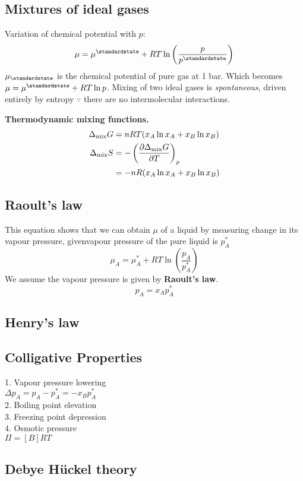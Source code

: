 \subsection*{Mixtures of ideal gases}
Variation of chemical potential with $p$:
\begin{equation*}
    \mu = \mu^\standardstate + RT \ln \left(\frac{p}{p^\standardstate}\right)
\end{equation*}
$\mu_\standardstate$ is the chemical potential of pure gas at 1 bar. Which becomes $ \mu = \mu^\standardstate + RT \ln p$. 
Mixing of two ideal gases is \textit{spontaneous}, driven entirely by entropy $\because$ there are no intermolecular interactions.
\vspace{\baselineskip}

\textbf{Thermodynamic mixing functions.}
\begin{equation*}
    \begin{aligned}
    \Delta_{\textrm{mix}}G &= nRT(x_A \ln x_A + x_B \ln x_B) \\
    \Delta_{\textrm{mix}}S &= - \left( \pdv{\Delta_{\textrm{mix}}G}{T}\right)_p \\
    &= -nR(x_A \ln x_A + x_B \ln x_B)
    \end{aligned}
\end{equation*}

\subsection*{Raoult's law}
This equation shows that we can obtain $\mu$ of a liquid by measuring
change in its vapour pressure, givenvapour pressure of the pure liquid is $p_A^*$
\begin{equation*}
    \mu_A = \mu_A^* + RT \ln \left(\frac{p_A}{p_A^*}\right)
\end{equation*}
We assume the vapour pressure is given by \textbf{Raoult's law}.
\begin{equation*}
    p_A = x_A p_A^*
\end{equation*}

\subsection*{Henry's law}

\subsection*{Colligative Properties}
1. Vapour pressure lowering \\
$\Delta p_A = p_A - p^{*}_{A} = -x_B p^*_A$ \\
2. Boiling point elevation \\
3. Freezing point depression \\
4. Osmotic pressure \\
$\Pi = [B]RT$
\subsection*{Debye H\"uckel theory}



 